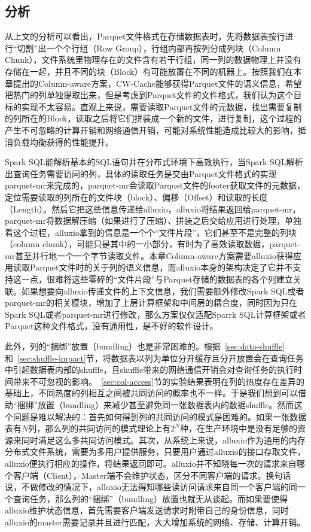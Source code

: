 \subsection{分析}
\label{subsec:simp-analysis}

\par 从上文的分析可以看出，Parquet文件格式在存储数据表时，先将数据表按行进行“切割”出一个个行组（Row Group），行组内部再按列分成列块（Column Chunk），文件系统里物理存在的文件含有若干行组，同一列的数据物理上并没有存储在一起，并且不同的块（Block）有可能放置在不同的机器上。按照我们在本章提出的Column-aware方案，CW-Cache能够获得Parquet文件的语义信息，希望把热门的列单独提取出来，但是考虑到Parquet文件的文件格式，我们认为这个目标的实现不太容易。直观上来说，需要读取Parquet文件的元数据，找出需要复制的列所在的Block，读取之后将它们拼装成一个新的文件，进行复制，这个过程的产生不可忽略的计算开销和网络通信开销，可能对系统性能造成比较大的影响，抵消负载均衡获得的性能提升。

\par Spark SQL能解析基本的SQL语句并在分布式环境下高效执行，当Spark SQL解析出查询任务需要访问的列，具体的读取任务是交由Parquet文件格式的实现parquet-mr\cite{parquet-mr}来完成的，parquet-mr会读取Parquet文件的footer获取文件的元数据，定位需要读取的列所在的文件块（block）、偏移（Offset）和读取的长度（Length）。然后它把这些信息传递给alluxio，alluxio将结果返回给parquet-mr，parquet-mr将数据解压缩（如果进行了压缩）、拼装之后交给应用进行处理，单独看这个过程，alluxio拿到的信息是一个个“文件片段”，它们甚至不是完整的列块（column chunk），可能只是其中的一小部分，有时为了高效读取数据，parquet-mr甚至并行地一个一个字节读取文件。本章Column-aware方案需要alluxio获得应用读取Parquet文件时的关于列的语义信息，而alluxio本身的架构决定了它并不支持这一点，很难将这些零碎的“文件片段”与Parquet存储的数据表的各个列建立关联。如果想要向alluxio传递文件的上下文信息，我们需要额外修改Spark SQL或者parquet-mr的相关模块，增加了上层计算框架和中间层的耦合度，同时因为只在Spark SQL或者parquet-mr进行修改，那么方案仅仅适配Sparrk SQL计算框架或者Parquet这种文件格式，没有通用性，是不好的软件设计。

\par 此外，列的“捆绑”放置（bundling）也是非常困难的。根据~\ref{sec:data-shuffle}和~\ref{sec:shuffle-impact}节，将数据表以列为单位分开缓存且分开放置会在查询任务中引起数据表内部的shuffle，且shuffle带来的网络通信开销会对查询任务的执行时间带来不可忽视的影响。~\ref{sec:col-access}节的实验结果表明在列的热度存在差异的基础上，不同热度的列相互之间被共同访问的概率也不一样。于是我们想到可以借助“捆绑”放置（bundling）来减少甚至避免同一张数据表内的数据shuffle。然而这个问题是难以解决的：首先如何得到列的共同访问的模式是困难的。如果一张数据表有$N$列，那么列的共同访问的模式理论上有$2^N$种，在生产环境中是没有足够的资源来同时满足这么多共同访问模式。其次，从系统上来说，alluxio作为通用的内存分布式文件系统，需要为多用户提供服务，只要用户通过alluxio的接口存取文件，alluxio便执行相应的操作，将结果返回即可。alluxio并不知晓每一次的请求来自哪个客户端（Client），Master端不会维护状态，区分不同客户端的请求。换句话说，不做修改的情况下，alluxio无法得知哪些读访问请求来自同一个客户端的同一个查询任务，那么列的“捆绑”（bundling）放置也就无从谈起。而如果要使得alluxio维护状态信息，首先需要客户端发送请求时附带自己的身份信息，同时alluxio的master需要记录并且进行匹配，大大增加系统的网络、存储、计算开销。

